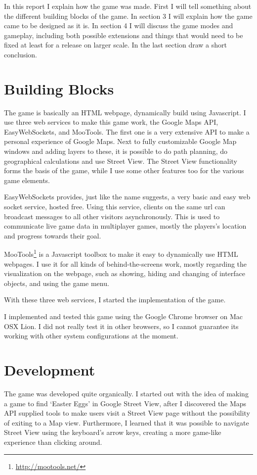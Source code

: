 \documentclass[a4paper,10pt]{article}
\begin{document}
In this report I explain how the game was made. First I will tell something about the different building blocks of the game. In section 3 I will explain how the game came to be designed as it is. In section 4 I will discuss the game modes and gameplay, including both possible extensions and things that would need to be fixed at least for a release on larger scale. In the last section draw a short conclusion.

\section{Building Blocks} %
\label{sec:building_blocks}
The game is basically an HTML webpage, dynamically build using Javascript.
I use three web services to make this game work, the Google Maps API, EasyWebSockets, and MooTools. The first one is a very extensive API to make
a personal experience of Google Maps. Next to fully customizable Google Map windows and adding layers to these, it is possible to do path planning, do
geographical calculations and use Street View. The Street View functionality forms the basis of the game, while I use some other features too for the various game elements.

EasyWebSockets provides, just like the name suggests, a very basic and easy web socket service, hosted free. Using this service, clients on the same url can broadcast messages to all other visitors asynchronously. This is used to communicate live game data in multiplayer games, mostly the players's location and progress towards their goal.

MooTools\footnote{\url{http://mootools.net/}} is a Javascript toolbox to make it easy to dynamically use HTML webpages. I use it for all kinds of behind-the-screens work, mostly regarding the visualization on the webpage, such as showing, hiding and changing of interface objects, and using the game menu.

With these three web services, I started the implementation of the game.

I implemented and tested this game using the Google Chrome browser on Mac OSX Lion. I did not really test it in other browsers, so I cannot guarantee its working with other system configurations at the moment.


\section{Development} %
\label{sec:Development}
The game was developed quite organically. I started out with the idea of making a game to find `Easter Eggs' in Google Street View, after I discovered the Maps API supplied tools to make users visit a Street View page without the possibility of exiting to a Map view. Furthermore, I learned that it was possible to navigate Street View using the keyboard's arrow keys, creating a more game-like experience than clicking around.
\end{document}
